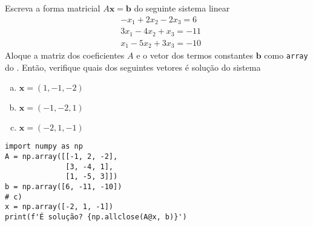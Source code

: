 \begin{exer}\label{cap_arr_sec_mat:exer:sislin}
  Escreva a forma matricial $A\pmb{x} = \pmb{b}$ do seguinte sistema linear
  \begin{subequations}
    \begin{align}
      &-x_1 + 2x_2 - 2x_3 = 6\\
      &3x_1 - 4x_2 + x_3 = -11\\
      &x_1 -5x_2 + 3x_3 = -10
    \end{align}
  \end{subequations}
  Aloque a matriz dos coeficientes $A$ e o vetor dos termos constantes $\pmb{b}$ como \lstinline+array+ do {\numpy}. Então, verifique quais dos seguintes vetores é solução do sistema
  \begin{enumerate}[a)]
  \item $\pmb{x} = (1, -1, -2)$
  \item $\pmb{x} = (-1, -2, 1)$
  \item $\pmb{x} = (-2, 1, -1)$
  \end{enumerate}
\end{exer}
\begin{resp}

\begin{lstlisting}
import numpy as np
A = np.array([[-1, 2, -2],
              [3, -4, 1],
              [1, -5, 3]])
b = np.array([6, -11, -10])
# c)
x = np.array([-2, 1, -1])
print(f'É solução? {np.allclose(A@x, b)}')
\end{lstlisting}

\end{resp}

